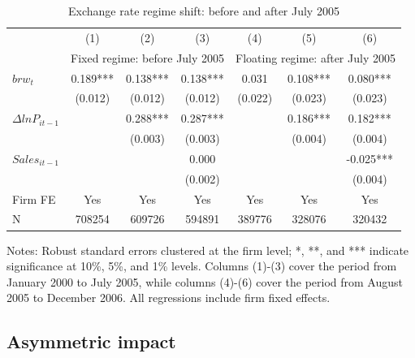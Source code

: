 \begin{table}[htbp]
    \centering
    \caption{Exchange rate regime shift: before and after July 2005}
    \begin{threeparttable}
    \begin{tabular}{lcccccc}
        \toprule
        & (1)   & (2)   & (3)   & (4)   & (5)   & (6) \\
        & \multicolumn{3}{c}{Fixed regime: before July 2005} & \multicolumn{3}{c}{Floating regime: after July 2005}  \\
        \midrule
        $brw_t$   & 0.189*** & 0.138*** & 0.138*** & 0.031 & 0.108*** & 0.080*** \\
              & (0.012) & (0.012) & (0.012) & (0.022) & (0.023) & (0.023) \\
        $\Delta ln P_{it-1}$ &       & 0.288*** & 0.287*** &       & 0.186*** & 0.182*** \\
              &       & (0.003) & (0.003) &       & (0.004) & (0.004) \\
        $Sales_{it-1}$ &       &       & 0.000 &       &       & -0.025*** \\
              &       &       & (0.002) &       &       & (0.004) \\
        \midrule
        Firm FE & Yes   & Yes   & Yes   & Yes   & Yes   & Yes \\
        N     & 708254 & 609726 & 594891 & 389776 & 328076 & 320432 \\
        \bottomrule
    \end{tabular}
        \begin{tablenotes}
            \footnotesize
            \item Notes: Robust standard errors clustered at the firm level;  *, **, and *** indicate significance at 10\%, 5\%, and 1\% levels. Columns (1)-(3) cover the period from January 2000 to July 2005, while columns (4)-(6) cover the period from August 2005 to December 2006. All regressions include firm fixed effects.
	\end{tablenotes}
    \end{threeparttable}
    \label{tab.regime}
\end{table}

\subsection{Asymmetric impact}









